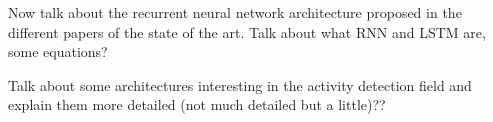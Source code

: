 Now talk about the recurrent neural network architecture proposed in the different papers of the state of the art. Talk about what RNN and LSTM are, some equations?

Talk about some architectures interesting in the activity detection field and explain them more detailed (not much detailed but a little)??

